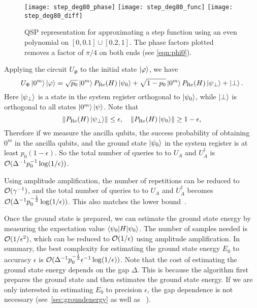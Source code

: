 \begin{figure}[H]
\begin{center}
\texttt{[image: step\_deg80\_phase]}
\texttt{[image: step\_deg80\_func]}
\texttt{[image: step\_deg80\_diff]}
\end{center}
\caption{QSP representation for approximating a step function using an even polynomial on $[0,0.1]\cup[0.2,1]$. The phase factors plotted removes a factor of $\pi/4$ on both ends (see \cref{eqn:phi0}).}
\label{fig:qsp_step_deg80}
\end{figure}


Applying the circuit $U_{\Phi}$ to the initial state $\ket{\varphi}$, we have
\begin{equation}
U_{\Phi}\ket{0^m}\ket{\varphi}=\sqrt{p_0} \ket{0^m} P_{\operatorname{Re}}(H) \ket{\psi_0}+\sqrt{1-p_0}\ket{0^m} P_{\operatorname{Re}}(H) \ket{\psi_{\perp}} + \ket{\perp}.
\end{equation}
Here $\ket{\psi_{\perp}}$ is a state in the system register orthogonal to $\ket{\psi_0}$, while $\ket{\perp}$ is orthogonal to all states $\ket{0^m}\ket{\psi}$. Note that 
\begin{equation}
\left\lVert P_{\operatorname{Re}}(H) \ket{\psi_{\perp}}\right\rVert\le \epsilon, \quad \left\lVert P_{\operatorname{Re}}(H) \ket{\psi_0}\right\rVert\ge 1-\epsilon,
\end{equation}
Therefore if we measure the ancilla qubits, the success probability of obtaining $0^m$ in the ancilla qubits, and the ground state $\ket{\psi_0}$ in the system register is at least $p_0 (1-\epsilon)$. So the total number of queries to to $U_A$ and $U_A^{\dag}$ is $\mathcal{O}(\Delta^{-1}p_0^{-1}\log(1/\epsilon) )$.

Using amplitude amplification, the number of repetitions can be reduced to $\mathcal{O}(\gamma^{-1})$, and the total number of queries to to $U_A$ and $U_A^{\dag}$ becomes $\mathcal{O}(\Delta^{-1} p_0^{-\frac12}\log(1/\epsilon) )$. This also matches the lower bound~\cite{LinTong2020a}.

Once the ground state is prepared, we can estimate the ground state energy by measuring the expectation value $\braket{\psi_0|H|\psi_0}$. The number of samples needed is $\mathcal{O}(1/\epsilon^2)$, which can be reduced to $\mathcal{O}(1/\epsilon)$ using amplitude amplification. In summary, the best complexity for estimating the ground state energy $E_0$ to accuracy $\epsilon$ is $\mathcal{O}(\Delta^{-1}p_0^{-\frac12}\epsilon^{-1}\log(1/\epsilon) )$. Note that the cost of estimating the ground state energy depends on the gap $\Delta$. 
This is because the algorithm first prepares the ground state and then estimates the ground state energy. 
If we are only interested in estimating $E_0$ to precision $\epsilon$, the gap dependence is not necessary (see~\cref{sec:groundenergy} as well as ~\cite{LinTong2020a}).



